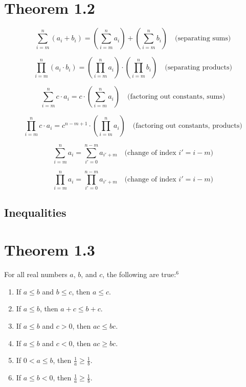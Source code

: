 \documentclass{article}
\begin{document}
\section*{Theorem 1.2}

\[
\sum_{i=m}^n (a_i + b_i) = \left( \sum_{i=m}^n a_i \right) + \left( \sum_{i=m}^n b_i \right) \quad \text{(separating sums)}
\]

\[
\prod_{i=m}^n (a_i \cdot b_i) = \left( \prod_{i=m}^n a_i \right) \cdot \left( \prod_{i=m}^n b_i \right) \quad \text{(separating products)}
\]

\[
\sum_{i=m}^n c \cdot a_i = c \cdot \left( \sum_{i=m}^n a_i \right) \quad \text{(factoring out constants, sums)}
\]

\[
\prod_{i=m}^n c \cdot a_i = c^{n-m+1} \cdot \left( \prod_{i=m}^n a_i \right) \quad \text{(factoring out constants, products)}
\]

\[
\sum_{i=m}^n a_i = \sum_{i'=0}^{n-m} a_{i'+m} \quad \text{(change of index \(i' = i-m\))}
\]

\[
\prod_{i=m}^n a_i = \prod_{i'=0}^{n-m} a_{i'+m} \quad \text{(change of index \(i' = i-m\))}
\]

\subsection{Inequalities}

\section*{Theorem 1.3} For all real numbers $a$, $b$, and $c$, the following are true:$^{6}$
\begin{enumerate}[label=(\alph*)]
    \item If $a \leq b$ and $b \leq c$, then $a \leq c$.
    \item If $a \leq b$, then $a + c \leq b + c$.
    \item If $a \leq b$ and $c > 0$, then $ac \leq bc$.
    \item If $a \leq b$ and $c < 0$, then $ac \geq bc$.
    \item If $0 < a \leq b$, then $\frac{1}{a} \geq \frac{1}{b}$.
    \item If $a \leq b < 0 $, then $\frac{1}{a} \geq \frac{1}{b}$.
\end{enumerate}
\end{document}
